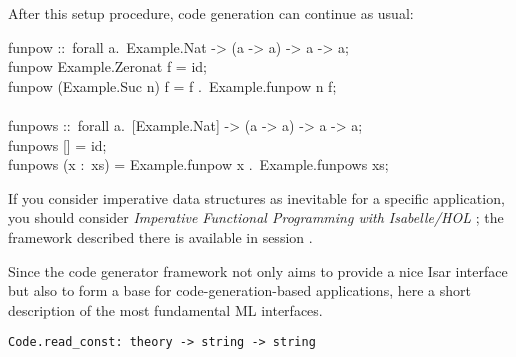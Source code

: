 \begin{isabellebody}
\begin{isamarkuptext}
  After this setup procedure, code generation can continue as usual:%
\end{isamarkuptext}%
\isamarkuptrue%
%
\isadelimquote
%
\endisadelimquote
%
\isatagquote
%
\begin{isamarkuptext}%
\isatypewriter%
\noindent%
\hspace*{0pt}funpow ::~forall a.~Example.Nat -> (a -> a) -> a -> a;\\
\hspace*{0pt}funpow Example.Zero{}nat f = id;\\
\hspace*{0pt}funpow (Example.Suc n) f = f .~Example.funpow n f;\\
\hspace*{0pt}\\
\hspace*{0pt}funpows ::~forall a.~[Example.Nat] -> (a -> a) -> a -> a;\\
\hspace*{0pt}funpows [] = id;\\
\hspace*{0pt}funpows (x :~xs) = Example.funpow x .~Example.funpows xs;%
\end{isamarkuptext}%
\isamarkuptrue%
%
\endisatagquote
{\isafoldquote}%
%
\isadelimquote
%
\endisadelimquote
%
\isamarkuptrue%
%
\begin{isamarkuptext}%
If you consider imperative data structures as inevitable for a
  specific application, you should consider \emph{Imperative
  Functional Programming with Isabelle/HOL}
  \cite{bulwahn-et-al:2008:imperative}; the framework described there
  is available in session .%
\end{isamarkuptext}%
\isamarkuptrue%
%
\isamarkuptrue%
%
\begin{isamarkuptext}%
Since the code generator framework not only aims to provide a nice
  Isar interface but also to form a base for code-generation-based
  applications, here a short description of the most fundamental ML
  interfaces.%
\end{isamarkuptext}%
\isamarkuptrue%
%
\isamarkuptrue%
%
\isadelimmlref
%
\endisadelimmlref
%
\isatagmlref
%
\begin{isamarkuptext}%
\begin{mldecls}
  \verb|Code.read_const: theory -> string -> string| \\

\end{mldecls}
\end{isamarkuptext}
\end{isabellebody}

